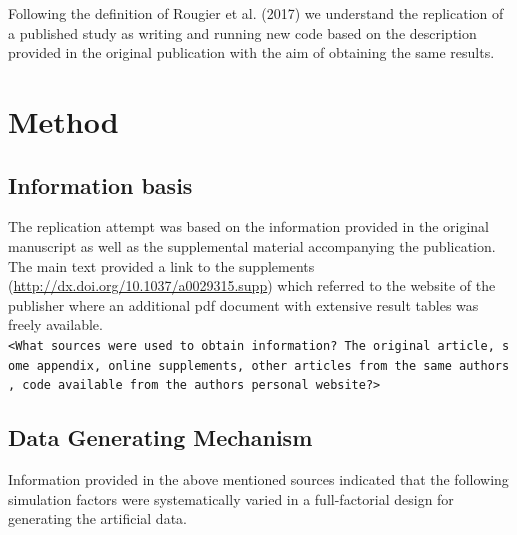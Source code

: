 \documentclass[10,a4paperpaper,]{article}
\begin{document}
Following the definition of Rougier et al. (2017) we understand the
replication of a published study as writing and running new code based
on the description provided in the original publication with the aim of
obtaining the same results.

\section{Method}

\subsection{Information basis}

The replication attempt was based on the information provided in the
original manuscript as well as the supplemental material accompanying
the publication. The main text provided a link to the supplements
(\url{http://dx.doi.org/10.1037/a0029315.supp}) which referred to the
website of the publisher where an additional pdf document with extensive
result tables was freely available.
\texttt{\textless{}What\ sources\ were\ used\ to\ obtain\ information?\ The\ original\ article,\ some\ appendix,\ online\ supplements,\ other\ articles\ from\ the\ same\ authors,\ code\ available\ from\ the\ authors\ personal\ website?\textgreater{}}

\subsection{Data Generating Mechanism}

Information provided in the above mentioned sources indicated that the
following simulation factors were systematically varied in a
full-factorial design for generating the artificial data.
\end{document}
